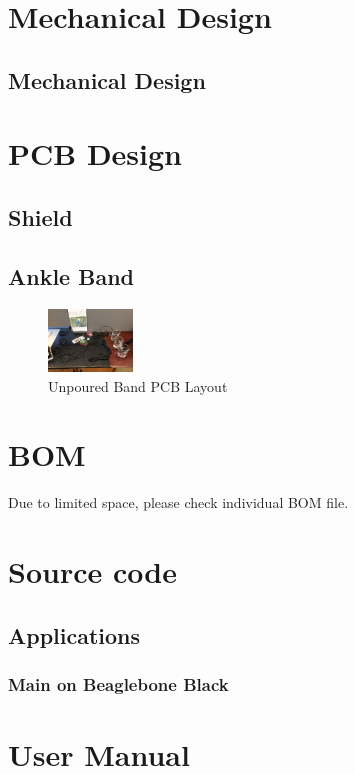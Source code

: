 \begin{appendices}
    \section{Mechanical Design}
        \subsection{Mechanical Design}
            \label{sw:structure}

            


    \section{PCB Design}
        \subsection{Shield}
           
        \subsection{Ankle Band}
            \label{ad:band}
            \begin{figure}[H]
            \centering
            \includegraphics[width=0.2\textwidth]{overall.jpg}
            \caption{\label{fig:band_layout}Unpoured Band PCB Layout}
            \end{figure}

    \section{BOM}
    Due to limited space, please check individual BOM file.

    \section{Source code}
        \subsection{Applications}
            \label{source:applications}
            \subsubsection{Main on Beaglebone Black}

    \section{User Manual}
\end{appendices}


